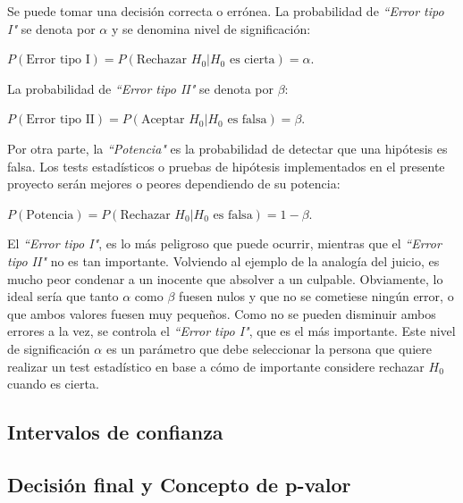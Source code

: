 Se puede tomar una decisión correcta o errónea. La probabilidad de \textit{``Error tipo I"} se denota por $\alpha$
y se denomina nivel de significación:
\begin{center}
$P(\mbox{Error tipo I}) = P(\mbox{Rechazar } H_0|H_0 \mbox{ es cierta}) =\alpha.$
\end{center}
La probabilidad de \textit{``Error tipo II"} se denota por $\beta$:
\begin{center}
$P(\mbox{Error tipo II}) = P(\mbox{Aceptar } H_0|H_0 \mbox{ es falsa}) =\beta.$
\end{center}
Por otra parte, la \textit{``Potencia"} es la probabilidad de detectar que una hipótesis es falsa. Los tests
estadísticos o pruebas de hipótesis implementados en el presente proyecto serán mejores o peores dependiendo
de su potencia:
\begin{center}
$P(\mbox{Potencia}) = P(\mbox{Rechazar } H_0|H_0 \mbox{ es falsa}) =1-\beta.$
\end{center}

El \textit{``Error tipo I"}, es lo más peligroso que puede ocurrir, mientras que el \textit{``Error tipo II"}
no es tan importante. Volviendo al ejemplo de la analogía del juicio, es mucho peor condenar a un inocente que
absolver a un culpable. Obviamente, lo ideal sería que tanto $\alpha$ como $\beta$ fuesen nulos y que no se
cometiese ningún error, o que ambos valores fuesen muy pequeños. Como no se pueden disminuir ambos errores a la
vez, se controla el \textit{``Error tipo I"}, que es el más importante. Este nivel de significación $\alpha$
es un parámetro que debe seleccionar la persona que quiere realizar un test estadístico en base a cómo de
importante considere rechazar $H_0$ cuando es cierta.


\subsection{Intervalos de confianza}


\subsection{Decisión final y Concepto de p-valor}

